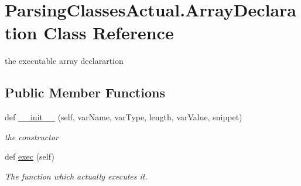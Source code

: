 \hypertarget{class_parsing_classes_actual_1_1_array_declaration}{}\section{Parsing\+Classes\+Actual.\+Array\+Declaration Class Reference}
\label{class_parsing_classes_actual_1_1_array_declaration}


the executable array declarartion  


\subsection*{Public Member Functions}
\begin{DoxyCompactItemize}
\item 
def \hyperlink{class_parsing_classes_actual_1_1_array_declaration_a3c5403f608468a688d68ae1f95a3569e}{\+\_\+\+\_\+init\+\_\+\+\_\+} (self, var\+Name, var\+Type, length, var\+Value, snippet)
\begin{DoxyCompactList}\small\item\em the constructor \end{DoxyCompactList}\item 
\mbox{\label{class_parsing_classes_actual_1_1_array_declaration_a039a011fe347df7f8b5c9cb821839304}} 
def \hyperlink{class_parsing_classes_actual_1_1_array_declaration_a039a011fe347df7f8b5c9cb821839304}{exec} (self)
\begin{DoxyCompactList}\small\item\em The function which actually executes it. \end{DoxyCompactList}\end{DoxyCompactItemize}
